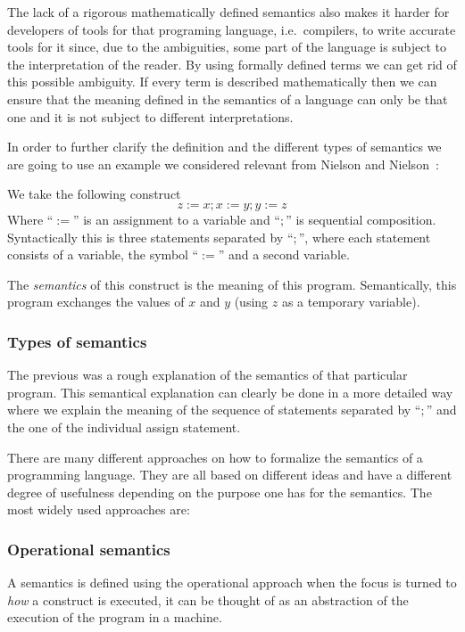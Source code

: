 The lack of a rigorous mathematically defined semantics also makes it harder for developers of tools for that programing language, i.e.\ compilers, to write accurate tools for it since, due to the ambiguities, some part of the language is subject to the interpretation of the reader.
By using formally defined terms we can get rid of this possible ambiguity.
If every term is described mathematically then we can ensure that the meaning defined in the semantics of a language can only be that one and it is not subject to different interpretations.

In order to further clarify the definition and the different types of semantics we are going to use an example we considered relevant from Nielson and Nielson~\parencite{nielson}:

We take the following construct
\begin{equation*}
z:=x; x:=y; y:=z
\end{equation*}
Where ``$:=$'' is an assignment to a variable and ``$;$'' is sequential composition.
Syntactically this is three statements separated by ``$;$'', where each statement consists of a variable, the symbol ``$:=$'' and a second variable.

The \textit{semantics} of this construct is the meaning of this program.
Semantically, this program exchanges the values of $x$ and $y$ (using $z$ as a temporary variable).

\subsubsection{Types of semantics}

The previous was a rough explanation of the semantics of that particular program.
This semantical explanation can clearly be done in a more detailed way where we explain the meaning of the sequence of statements separated by ``$;$'' and the one of the individual assign statement.

There are many different approaches on how to formalize the semantics of a programming language.
They are all based on different ideas and have a different degree of usefulness depending on the purpose one has for the semantics.
The most widely used approaches are:


\subsubsection{Operational semantics}

A semantics is defined using the operational approach when the focus is turned to \textit{how} a construct is executed, it can be thought of as an abstraction of the execution of the program in a machine.~\parencite{nielson}

